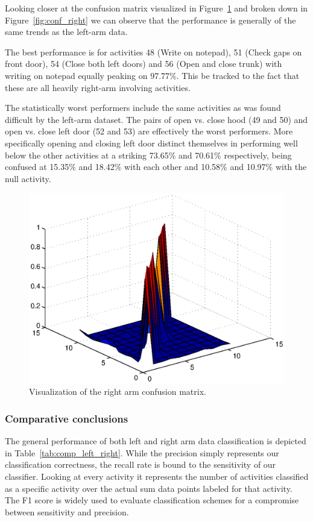 \documentclass{sig-alternate}
\begin{document}
Looking closer at the confusion matrix visualized in Figure~\ref{fig:conf_right_surf} and broken down in Figure~\ref{fig:conf_right} we can observe that the performance is generally of the same trends as the left-arm data. 

The best performance is for activities 48 (Write on notepad), 51 (Check gaps on front door), 54 (Close both left doors) and 56 (Open and close trunk) with writing on notepad equally peaking on 97.77\%. This be tracked to the fact that these are all heavily right-arm involving activities.

The statistically worst performers include the same activities as was found difficult by the left-arm dataset. The pairs of open vs. close hood (49 and 50) and open vs. close left door (52 and 53) are effectively the worst performers. More specifically opening and closing left door distinct themselves in performing well below the other activities at a striking 73.65\% and 70.61\% respectively, being confused at 15.35\% and 18.42\% with each other and 10.58\% and 10.97\% with the null activity.

\begin{figure}
  \centering
  \includegraphics[scale=0.4]{./matlab_output/nConfkNN_right.eps}
  \caption{Visualization of the right arm confusion matrix.}
  \label{fig:conf_right_surf}
\end{figure}

\subsubsection{Comparative conclusions}
The general performance of both left and right arm data classification is depicted in Table~\ref{tab:comp_left_right}. While the precision simply represents our classification correctness, the recall rate is bound to the sensitivity of our classifier. Looking at every activity it represents the number of activities classified as a specific activity over the actual sum data points labeled for that activity. The F1 score is widely used to evaluate classification schemes for a compromise between sensitivity and precision.
\end{document}
